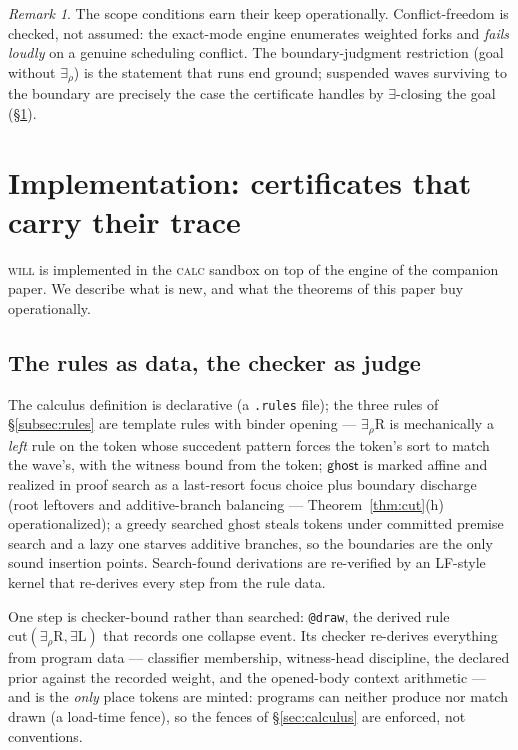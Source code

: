 \documentclass[11pt]{article}
\newcommand{\will}{\textsc{will}}                %
\newcommand{\calc}{\textsc{calc}}                %
\newcommand{\ghost}{\mathsf{ghost}}
\theoremstyle{definition}
\theoremstyle{remark}
\newtheorem{remark}[theorem]{Remark}
\begin{document}
\begin{remark}
The scope conditions earn their keep operationally.  Conflict-freedom
is checked, not assumed: the exact-mode engine enumerates weighted
forks and \emph{fails loudly} on a genuine scheduling conflict.  The
boundary-judgment restriction (goal without $\exists_\rho$) is the
statement that runs end ground; suspended waves surviving to the
boundary are precisely the case the certificate handles by
$\exists$-closing the goal (\S\ref{sec:impl}).
\end{remark}

\section{Implementation: certificates that carry their trace}
\label{sec:impl}

\will{} is implemented in the \calc{} sandbox on top of the engine of
the companion paper.  We describe what is new, and what the theorems
of this paper buy operationally.

\subsection{The rules as data, the checker as judge}

The calculus definition is declarative (a \texttt{.rules} file); the
three rules of \S\ref{subsec:rules} are template rules with binder
opening --- $\exists_\rho$R is mechanically a \emph{left} rule on the
token whose succedent pattern forces the token's sort to match the
wave's, with the witness bound from the token; $\ghost$ is marked
affine and realized in proof search as a last-resort focus choice plus
boundary discharge (root leftovers and additive-branch balancing ---
Theorem~\ref{thm:cut}(h) operationalized); a greedy searched ghost
steals tokens under committed premise search and a lazy one starves
additive branches, so the boundaries are the only sound insertion
points.  Search-found derivations are re-verified by an LF-style
kernel that re-derives every step from the rule data.

One step is checker-bound rather than searched: \texttt{@draw}, the
derived rule $\mathrm{cut}(\exists_\rho\text{R},\exists\text{L})$ that
records one collapse event.  Its checker re-derives everything from
program data --- classifier membership, witness-head discipline, the
declared prior against the recorded weight, and the opened-body
context arithmetic --- and is the \emph{only} place tokens are minted:
programs can neither produce nor match \textsf{drawn} (a load-time
fence), so the fences of \S\ref{sec:calculus} are enforced, not
conventions.
\end{document}
